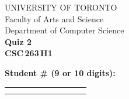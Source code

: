 \documentclass[12pt]{article}
\begin{document}
\newcommand{\spacer}[]{
  \vspace{5mm}\\
}

\newcommand{\hspacer}[]{\\
}

\begin{center}\large
  UNIVERSITY OF TORONTO\\
  Faculty of Arts and Science\\[1.75ex]
  Department of Computer Science\\[1.75ex]
  \textbf{Quiz 2} \\
  \textbf{{CSC\,263\,H1}}
\end{center}


\noindent \textbf{Student \# (9 or 10 digits):} \begin{table}[H]
    \begin{tabular}{|c|c|c|c|c|c|c|c|c|c|}
      \hline
      \hspace{1.2em}\; & \hspace{1.2em}\; & \hspace{1.2em}\; & \hspace{1.2em}\; & \hspace{1.2em}\; & \hspace{1.2em}\; & \hspace{1.2em}\; & \hspace{1.2em}\; & \hspace{1.2em}\; & \hspace{1.2em}\; \\
      \hspace{1.2em}\; & \hspace{1.2em}\; & \hspace{1.2em}\; & \hspace{1.2em}\; & \hspace{1.2em}\; & \hspace{1.2em}\; & \hspace{1.2em}\; & \hspace{1.2em}\; & \hspace{1.2em}\; & \hspace{1.2em}\;\\\hline
    \end{tabular}%
  \end{table}
\end{document}
